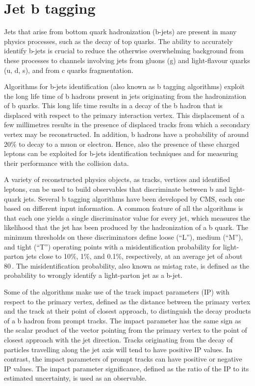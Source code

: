 \section{Jet b tagging}\label{sec:btag}

Jets that arise from bottom quark hadronization (b-jets) are present in many physics processes,
such as the decay of top quarks. The ability to accurately identify b-jets is crucial to reduce the otherwise overwhelming background from these processes to channels involving jets from gluons (g) and light-flavour quarks (u, d, s), and from c quarks fragmentation.

Algorithms for b-jets identification (also known as b tagging algorithms) exploit the long life time of b hadrons present in jets originating from the hadronization of b quarks. This long life time results in a decay of the b hadron that is displaced with respect to the primary interaction vertex. This displacement of a few millimetres results in the presence of displaced tracks from which a secondary vertex may be reconstructed. In addition, b hadrons have a probability of around 20\% to decay to a muon or electron. Hence, also the presence of these charged leptons can be exploited for b-jets identification techniques and for measuring their performance with the collision data.

A variety of reconstructed physics objects, as tracks, vertices and identified leptons, can be used to build observables that discriminate between b and light-quark jets. Several b tagging algorithms have been developed by CMS, each one based on different input information. A common feature of all the algorithms is that each one yields a single discriminator value for every jet, which measures the likelihood that the jet has been produced by the hadronization of a b quark. The minimum thresholds on these discriminators define loose (``L''), medium (``M''), and tight (``T'') operating points with a misidentification probability for light-parton jets close to 10\%, 1\%, and 0.1\%, respectively, at an average jet \pt of about 80\,\GeV. The misidentification probability, also known as mistag rate, is defined as the probability to wrongly identify a light-parton jet as a b-jet.

Some of the algorithms make use of the track impact parameters (IP) with respect to the primary vertex, defined as the distance between the primary vertex and the track at their point of closest approach, to distinguish the decay products of a b hadron from prompt tracks. The impact parameter has the same sign as the scalar product of the vector pointing from the primary vertex to the point of closest approach with the jet direction. Tracks originating from the decay of particles travelling along the jet axis will tend to have positive IP values. In contrast, the impact parameters of prompt tracks can have positive or negative IP values. The impact parameter significance, defined as the ratio of the IP to its estimated uncertainty, is used as an observable.

